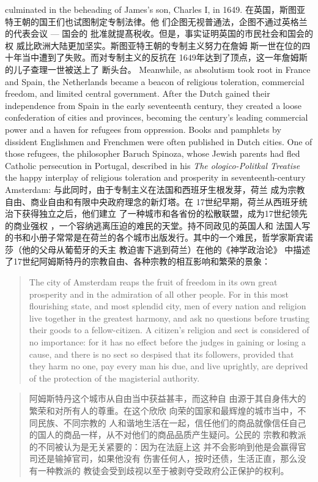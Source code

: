 \begin{paracol}{2}
culminated in the beheading of James's son, Charles I, in 1649.
\switchcolumn
在英国，斯图亚特王朝的国王们也试图制定专制法律。他
们企图无视普通法，企图不通过英格兰的代表会议 --- 国会的
批准就提髙税收。但是，事实证明英国的市民社会和国会的权
威比欧洲大陆更加坚实。斯图亚特王朝的专制主义努力在詹姆
斯一世在位的四十年当中遭到了失败。而对专制主义的反抗在
1649年达到了顶点，这一年詹姆斯的儿子查理一世被送上了
断头台。
\switchcolumn*
Meanwhile, as absolutism took root in France and Spain, the
Netherlands became a beacon of religious toleration, commercial freedom, and limited central government. After the Dutch
gained their independence from Spain in the early seventeenth
century, they created a loose confederation of cities and
provinces, becoming the century's leading commercial power
and a haven for refugees from oppression. Books and pamphlets
by dissident Englishmen and Frenchmen were often published
in Dutch cities. One of those refugees, the philosopher Baruch
Spinoza, whose Jewish parents had fled Catholic persecution in
Portugal, described in his \textit{The ologico-Politkal Treatise} the happy
interplay of religious toleration and prosperity in seventeenth-century Amsterdam:
\switchcolumn
与此同时，由于专制主义在法国和西班牙生根发芽，荷兰
成为宗教自由、商业自由和有限中央政府理念的新灯塔。在
17世纪早期，荷兰从西班牙统治下获得独立之后，他们建立
了一种城市和各省份的松散联盟，成为17世纪领先的商业强权 ，一个容纳逃离压迫的难民的天堂。持不同政见的英国人和
法国人写的书和小册子常常是在荷兰的各个城市出版发行。其中的一个难民，哲学家斯宾诺莎（他的父母从葡萄牙的夭主
教迫害下逃到荷兰）在他的《神学政治论》 中描述了17世纪阿姆斯特丹的宗教自由、各种宗教的相互影响和繁荣的景象：
\switchcolumn*
\begin{quote}
The city of Amsterdam reaps the fruit of freedom in its own great
prosperity and in the admiration of all other people. For in this
most flourishing state, and most splendid city, men of every nation and religion live together in the greatest harmony, and ask
no questions before trusting their goods to a fellow-citizen. A citizen's religion and sect is considered of no importance: for it has
no effect before the judges in gaining or losing a cause, and there
is no sect so despised that its followers, provided that they harm
no one, pay every man his due, and live uprightly, are deprived of
the protection of the magisterial authority.
\end{quote}
\switchcolumn
\begin{quote}
阿姆斯特丹这个城市从自由当中获益甚丰，而这种自
由源于其自身伟大的繁荣和对所有人的尊重。在这个欣欣
向荣的国家和最辉煌的城市当中，不同民族、不同宗教的
人和谐地生活在一起，信任他们的商品就像信任自己的国人的商品一样，从不对他们的商品品质产生疑问。公民的
宗教和教派的不同被认为是无关紧要的：因为在法庭上这
并不会影响到他是会赢得官司还是输掉官司，如果他没有
伤害任何人，按时还债，生活正直，那么没有一种教派的
教徒会受到歧视以至于被剥夺受政府公正保护的权利。
\end{quote}


\end{paracol}
